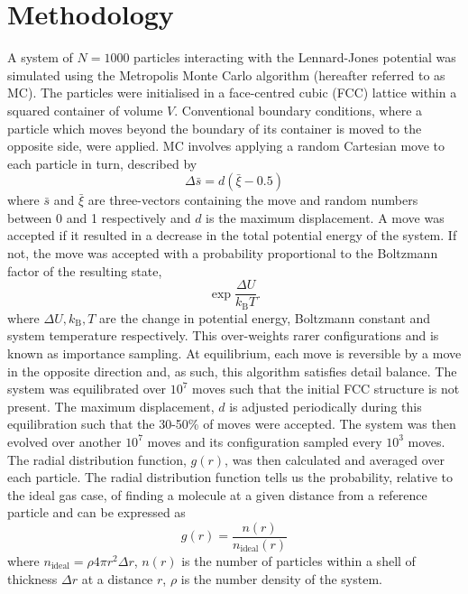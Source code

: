 \documentclass[10pt, twocolumn]{revtex4}    %
\begin{document}
\section{Methodology} \label{s:methods}
A system of $N=1000$ particles interacting with the Lennard-Jones potential was simulated using the Metropolis Monte Carlo algorithm (hereafter referred to as MC). The particles were initialised in a face-centred cubic (FCC) lattice within a squared container of volume $V$. Conventional boundary conditions, where a particle which moves beyond the boundary of its container is moved to the opposite side, were applied. MC involves applying a random Cartesian move to each particle in turn, described by
\begin{displaymath}
\Delta{}\bar{s} = d\left(\bar{\xi}-0.5\right)
\end{displaymath}
where $\bar{s}$ and $\bar{\xi}$ are three-vectors containing the move and random numbers between 0 and 1 respectively and $d$ is the maximum displacement.
A move was accepted if it resulted in a decrease in the total potential energy of the system. If not, the move was accepted with a probability proportional to the Boltzmann factor of the resulting state,
\begin{displaymath}
\exp{\frac{\Delta{}U}{k_\text{B}T}}.
\end{displaymath}
where $\Delta{}U, k_\text{B}, T$ are the change in potential energy, Boltzmann constant and system temperature respectively.
This over-weights rarer configurations and is known as importance sampling. At equilibrium, each move is reversible by a move in the opposite direction and, as such, this algorithm satisfies detail balance.
The system was equilibrated over $10^7$ moves such that the initial FCC structure is not present. The maximum displacement, $d$ is adjusted periodically during this equilibration such that the 30-50\% of moves were accepted.
The system was then evolved over another $10^7$ moves and its configuration sampled every $10^3$ moves. The radial distribution function, $g(r)$, was then calculated and averaged over each particle. The radial distribution function tells us the probability, relative to the ideal gas case, of finding a molecule at a given distance from a reference particle and can be expressed as
\begin{displaymath}
g(r) = \frac{n(r)}{n_\text{ideal}(r)}
\end{displaymath}
where $n_\text{ideal} = \rho{}4\pi{}r^{2}\Delta{}r$, $n(r)$ is the number of particles within a shell of thickness $\Delta{}r$ at a distance $r$, $\rho{}$ is the number density of the system.
\end{document}

